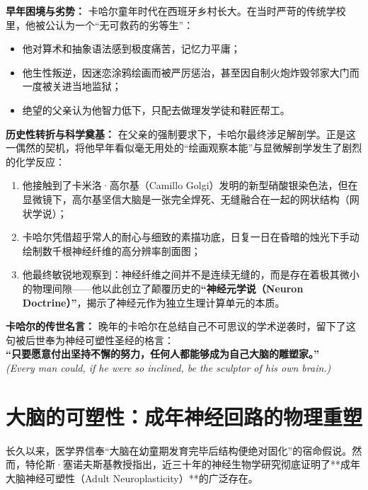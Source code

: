 \documentclass[12pt,a4paper,openany]{ctexbook}
\begin{document}
\begin{casebox}
\textbf{早年困境与劣势：}
卡哈尔童年时代在西班牙乡村长大。在当时严苛的传统学校里，他被公认为一个“无可救药的劣等生”：
\begin{itemize}
    \item 他对算术和抽象语法感到极度痛苦，记忆力平庸；
    \item 他生性叛逆，因迷恋涂鸦绘画而被严厉惩治，甚至因自制火炮炸毁邻家大门而一度被关进当地监狱；
    \item 绝望的父亲认为他智力低下，只配去做理发学徒和鞋匠帮工。
\end{itemize}

\textbf{历史性转折与科学奠基：}
在父亲的强制要求下，卡哈尔最终涉足解剖学。正是这一偶然的契机，将他早年看似毫无用处的“绘画观察本能”与显微解剖学发生了剧烈的化学反应：
\begin{enumerate}
    \item 他接触到了卡米洛·高尔基（Camillo Golgi）发明的新型硝酸银染色法，但在显微镜下，高尔基坚信大脑是一张完全焊死、无缝融合在一起的网状结构（网状学说）；
    \item 卡哈尔凭借超乎常人的耐心与细致的素描功底，日复一日在昏暗的烛光下手动绘制数千根神经纤维的高分辨率剖面图；
    \item 他最终敏锐地观察到：神经纤维之间并不是连续无缝的，而是存在着极其微小的物理间隙——他以此创立了颠覆历史的\textbf{“神经元学说（Neuron Doctrine）”}，揭示了神经元作为独立生理计算单元的本质。
\end{enumerate}

\textbf{卡哈尔的传世名言：}
晚年的卡哈尔在总结自己不可思议的学术逆袭时，留下了这句被后世奉为神经可塑性圣经的格言：\\
\textbf{“只要愿意付出坚持不懈的努力，任何人都能够成为自己大脑的雕塑家。”}\\
\emph{(Every man could, if he were so inclined, be the sculptor of his own brain.)}
\end{casebox}

\section{大脑的可塑性：成年神经回路的物理重塑}

长久以来，医学界信奉“大脑在幼童期发育完毕后结构便绝对固化”的宿命假说。然而，特伦斯·塞诺夫斯基教授指出，近三十年的神经生物学研究彻底证明了**成年大脑神经可塑性（Adult Neuroplasticity）**的广泛存在。
\end{document}
